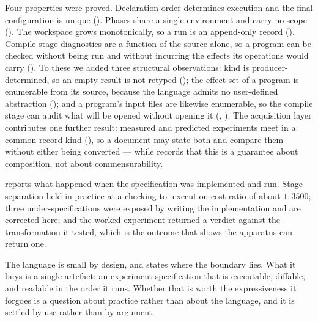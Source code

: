 \documentclass[11pt,twocolumn,a4paper]{article}
\theoremstyle{ssthm}
\theoremstyle{definition}
\theoremstyle{remark}
\begin{document}
Four properties were proved. Declaration order determines execution and
the final configuration is unique (). Phases share
a single environment and carry no scope (). The
workspace grows monotonically, so a run is an append-only record
(). Compile-stage diagnostics are a function of the
source alone, so a program can be checked without being run and without
incurring the effects its operations would carry
(). To these we added three structural
observations: kind is producer-determined, so an empty result is not
retyped (); the effect set of a program is
enumerable from its source, because the language admits no user-defined
abstraction (); and a program's input files are
likewise enumerable, so the compile stage can audit what will be opened
without opening it (, ).
The acquisition layer contributes one further result: measured and
predicted experiments meet in a common record kind
(), so a document may state both and compare them
without either being converted --- while  records
that this is a guarantee about composition, not about commensurability.

 reports what happened when the specification was
implemented and run. Stage separation held in practice at a checking-to-
execution cost ratio of about $1:3500$; three under-specifications were
exposed by writing the implementation and are corrected here; and the
worked experiment returned a verdict against the transformation it
tested, which is the outcome that shows the apparatus can return one.

The language is small by design, and  states where the
boundary lies. What it buys is a single artefact: an experiment
specification that is executable, diffable, and readable in the order it
runs. Whether that is worth the expressiveness it forgoes is a question
about practice rather than about the language, and it is settled by use
rather than by argument.



\end{document}
